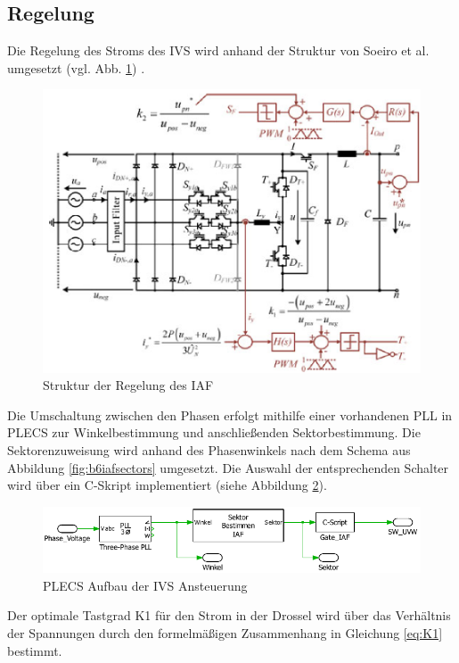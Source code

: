 	\subsection{Regelung}
		
		
		Die Regelung des Stroms des IVS wird anhand der Struktur von Soeiro et al. umgesetzt (vgl. Abb. \ref{fig:iafpapercontrol}) \cite{Soeiro.2013}. 
		 \begin{figure}
			\centering
			\includegraphics[width=0.8\linewidth]{content/Grafiken/IAF_Paper_Control}
			\caption{Struktur der Regelung des IAF \cite{Soeiro.2013}}
			\label{fig:iafpapercontrol}
		\end{figure}
		Die Umschaltung zwischen den Phasen erfolgt mithilfe einer vorhandenen PLL in PLECS zur Winkelbestimmung und anschließenden Sektorbestimmung. Die Sektorenzuweisung wird anhand des Phasenwinkels nach dem Schema aus Abbildung \ref{fig:b6iafsectors} umgesetzt. Die Auswahl der entsprechenden Schalter wird über ein C-Skript implementiert (siehe Abbildung \ref{fig:plecsiafivscontrol}). 
		\begin{figure}
			\centering
			\includegraphics[width=1\linewidth]{content/Grafiken/PlecsIAFivscontrol}
			\caption{PLECS Aufbau der \gls{IVS} Ansteuerung}
			\label{fig:plecsiafivscontrol}
		\end{figure}
		Der optimale Tastgrad K1 für den Strom in der Drossel wird über das Verhältnis der Spannungen durch den formelmäßigen Zusammenhang in Gleichung \ref{eq:K1} bestimmt. 
		

